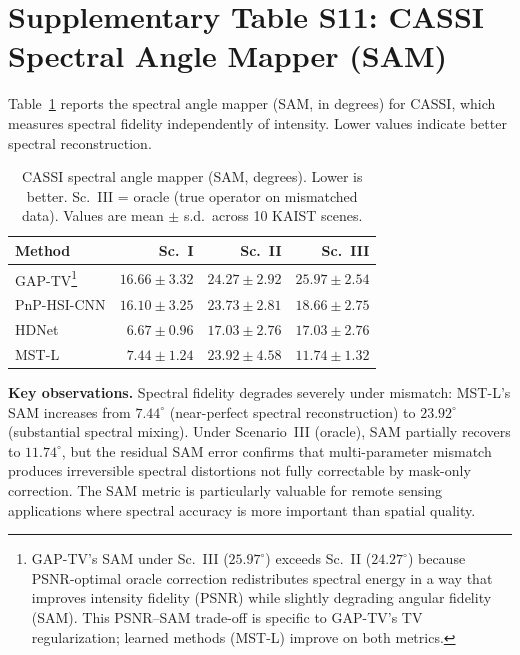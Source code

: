 \documentclass[11pt]{article}
\theoremstyle{definition}
\begin{document}
\section{Supplementary Table S11: CASSI Spectral Angle Mapper (SAM)}
\label{sec:sam}

Table~\ref{tab:sam} reports the spectral angle mapper (SAM, in degrees)
for CASSI, which measures spectral fidelity independently of intensity.
Lower values indicate better spectral reconstruction.

\begin{table}[htbp]
\centering
\caption{CASSI spectral angle mapper (SAM, degrees). Lower is better.
Sc.~III = oracle (true operator on mismatched data).
Values are mean $\pm$ s.d.\ across 10 KAIST scenes.}
\label{tab:sam}
\begin{tabular}{l r r r}
\toprule
\textbf{Method} &
  \textbf{Sc.~I} & \textbf{Sc.~II} & \textbf{Sc.~III} \\
\midrule
GAP-TV\footnote{GAP-TV's SAM under Sc.~III ($25.97^\circ$) exceeds Sc.~II ($24.27^\circ$) because PSNR-optimal oracle correction redistributes spectral energy in a way that improves intensity fidelity (PSNR) while slightly degrading angular fidelity (SAM).  This PSNR--SAM trade-off is specific to GAP-TV's TV regularization; learned methods (MST-L) improve on both metrics.}      & $16.66 \pm 3.32$ & $24.27 \pm 2.92$ & $25.97 \pm 2.54$ \\
PnP-HSI-CNN & $16.10 \pm 3.25$ & $23.73 \pm 2.81$ & $18.66 \pm 2.75$ \\
HDNet       & $6.67 \pm 0.96$  & $17.03 \pm 2.76$ & $17.03 \pm 2.76$ \\
MST-L       & $7.44 \pm 1.24$  & $23.92 \pm 4.58$ & $11.74 \pm 1.32$ \\
\bottomrule
\end{tabular}
\end{table}

\noindent\textbf{Key observations.}
Spectral fidelity degrades severely under mismatch: MST-L's SAM increases
from $7.44^\circ$ (near-perfect spectral reconstruction) to $23.92^\circ$
(substantial spectral mixing). Under Scenario~III (oracle), SAM partially recovers
to $11.74^\circ$, but the residual SAM error confirms
that multi-parameter mismatch produces irreversible spectral distortions
not fully correctable by mask-only correction. The SAM metric is
particularly valuable for remote sensing applications where spectral
accuracy is more important than spatial quality.
\end{document}
